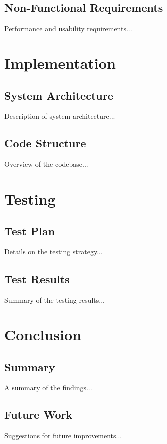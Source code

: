\documentclass[a4paper,12pt]{report}
\begin{document}
\section{Non-Functional Requirements}
Performance and usability requirements...

\chapter{Implementation}
\section{System Architecture}
Description of system architecture...
\section{Code Structure}
Overview of the codebase...

\chapter{Testing}
\section{Test Plan}
Details on the testing strategy...
\section{Test Results}
Summary of the testing results...

\chapter{Conclusion}
\section{Summary}
A summary of the findings...
\section{Future Work}
Suggestions for future improvements...
\end{document}
